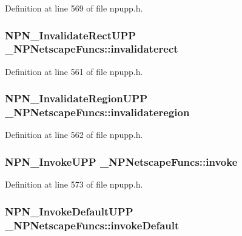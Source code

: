Definition at line 569 of file npupp.h.

\hypertarget{struct___n_p_netscape_funcs_a02a38e747a2da4b9736b24d822c10d6c}{
\subsubsection[{invalidaterect}]{\setlength{\rightskip}{0pt plus 5cm}NPN\_\-InvalidateRectUPP {\bf \_\-NPNetscapeFuncs::invalidaterect}}}
\label{struct___n_p_netscape_funcs_a02a38e747a2da4b9736b24d822c10d6c}


Definition at line 561 of file npupp.h.

\hypertarget{struct___n_p_netscape_funcs_ac382022e7d9c2c262454fe7288956e0d}{
\subsubsection[{invalidateregion}]{\setlength{\rightskip}{0pt plus 5cm}NPN\_\-InvalidateRegionUPP {\bf \_\-NPNetscapeFuncs::invalidateregion}}}
\label{struct___n_p_netscape_funcs_ac382022e7d9c2c262454fe7288956e0d}


Definition at line 562 of file npupp.h.

\hypertarget{struct___n_p_netscape_funcs_a35679bfb5cc423fb174de970cd7a6c33}{
\subsubsection[{invoke}]{\setlength{\rightskip}{0pt plus 5cm}NPN\_\-InvokeUPP {\bf \_\-NPNetscapeFuncs::invoke}}}
\label{struct___n_p_netscape_funcs_a35679bfb5cc423fb174de970cd7a6c33}


Definition at line 573 of file npupp.h.

\hypertarget{struct___n_p_netscape_funcs_a5635ae6c76d3886e8a016b6a4cbc8fb9}{
\subsubsection[{invokeDefault}]{\setlength{\rightskip}{0pt plus 5cm}NPN\_\-InvokeDefaultUPP {\bf \_\-NPNetscapeFuncs::invokeDefault}}}
\label{struct___n_p_netscape_funcs_a5635ae6c76d3886e8a016b6a4cbc8fb9}


